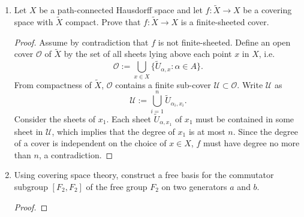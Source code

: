 \documentclass{article}
\begin{document}
\begin{enumerate}[label={\bf Q\arabic*:}]
\begin{proof}
      Now each $U_i$ is contractible to the point $X\times\{i\}/\sim$ in
      $\sum X$, hence each $U_i$ has trivial fundamental group
      $1=\langle|\rangle$. Applying van-Kampen's theorem illustrated in
      Figure 3b,
      \begin{align*}
        \pi_1(\sum X,p) &= \langle|\rangle / \pi_1(U_0\cap U_1,p) \\
                        &= \langle|\rangle \\
                        &= 1. \\
      \end{align*}
      Hence $\sum X$ has trivial fundamental group. \\

      Consider the example where $X$ comprises of two distinct points. Then
      $\sum X$ will be homeomorphic to $S^1$, which has fundamental group
      $\mathbb{Z}\neq 1$.
    \end{proof}

  \item Let $X$ be a path-connected Hausdorff space and let
    $f:\widetilde{X}\rightarrow X$ be a covering space with $\widetilde{X}$
    compact. Prove that $f:\widetilde{X}\rightarrow X$  is a
    finite-sheeted cover.

    \begin{proof}
      Assume by contradiction that $f$ is not finite-sheeted. Define an
      open cover $\mathcal{O}$ of $\widetilde{X}$ by the set of all sheets
      lying above each point $x$ in $X$, i.e.
      \begin{equation*}
        \mathcal{O} := \bigcup_{x\in X}
          \{\widetilde{U}_{\alpha,x}:\alpha\in A\}.
      \end{equation*}
      From compactness of $\widetilde{X}$, $\mathcal{O}$ contains a finite
      sub-cover $\mathcal{U}\subset\mathcal{O}$. Write $\mathcal{U}$ as
      \begin{equation*}
        \mathcal{U} := \bigcup_{i=1}^n \widetilde{U}_{\alpha_i,x_i}.
      \end{equation*}
      Consider the sheets of $x_1$. Each sheet $\widetilde{U}_{\alpha,x_1}$
      of $x_1$ must be contained in some sheet in $\mathcal{U}$, which
      implies that the degree of $x_1$ is at most $n$. Since the degree of
      a cover is independent on the choice of $x\in X$, $f$ must have
      degree no more than $n$, a contradiction.
    \end{proof}

  \item Using covering space theory, construct a free basis for the
    commutator subgroup $[F_2,F_2]$ of the free group $F_2$ on two
    generators $a$ and $b$.

    \begin{proof}
    \end{proof}
\end{enumerate}
\end{document}

